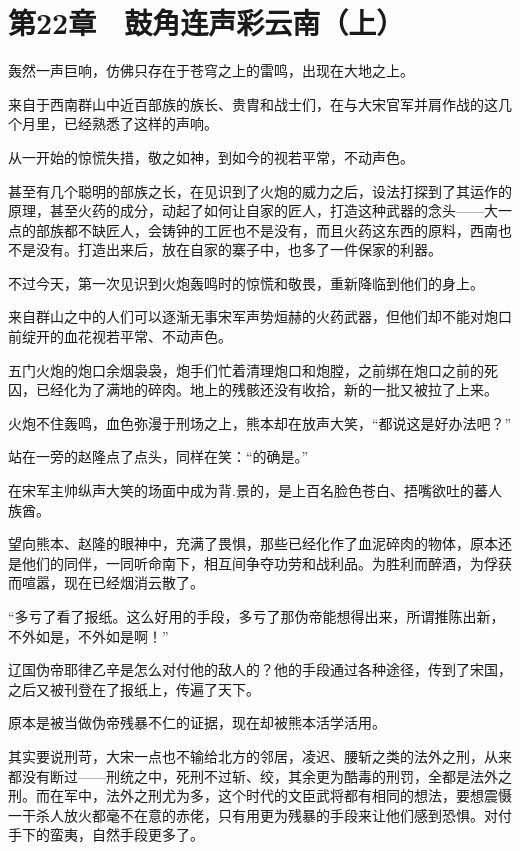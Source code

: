 \section{第22章　鼓角连声彩云南（上）}

轰然一声巨响，仿佛只存在于苍穹之上的雷鸣，出现在大地之上。

来自于西南群山中近百部族的族长、贵胄和战士们，在与大宋官军并肩作战的这几个月里，已经熟悉了这样的声响。

从一开始的惊慌失措，敬之如神，到如今的视若平常，不动声色。

甚至有几个聪明的部族之长，在见识到了火炮的威力之后，设法打探到了其运作的原理，甚至火药的成分，动起了如何让自家的匠人，打造这种武器的念头——大一点的部族都不缺匠人，会铸钟的工匠也不是没有，而且火药这东西的原料，西南也不是没有。打造出来后，放在自家的寨子中，也多了一件保家的利器。

不过今天，第一次见识到火炮轰鸣时的惊慌和敬畏，重新降临到他们的身上。

来自群山之中的人们可以逐渐无事宋军声势烜赫的火药武器，但他们却不能对炮口前绽开的血花视若平常、不动声色。

五门火炮的炮口余烟袅袅，炮手们忙着清理炮口和炮膛，之前绑在炮口之前的死囚，已经化为了满地的碎肉。地上的残骸还没有收拾，新的一批又被拉了上来。

火炮不住轰鸣，血色弥漫于刑场之上，熊本却在放声大笑，“都说这是好办法吧？”

站在一旁的赵隆点了点头，同样在笑：“的确是。”

在宋军主帅纵声大笑的场面中成为背.景的，是上百名脸色苍白、捂嘴欲吐的蕃人族酋。

望向熊本、赵隆的眼神中，充满了畏惧，那些已经化作了血泥碎肉的物体，原本还是他们的同伴，一同听命南下，相互间争夺功劳和战利品。为胜利而醉酒，为俘获而喧嚣，现在已经烟消云散了。

“多亏了看了报纸。这么好用的手段，多亏了那伪帝能想得出来，所谓推陈出新，不外如是，不外如是啊！”

辽国伪帝耶律乙辛是怎么对付他的敌人的？他的手段通过各种途径，传到了宋国，之后又被刊登在了报纸上，传遍了天下。

原本是被当做伪帝残暴不仁的证据，现在却被熊本活学活用。

其实要说刑苛，大宋一点也不输给北方的邻居，凌迟、腰斩之类的法外之刑，从来都没有断过——刑统之中，死刑不过斩、绞，其余更为酷毒的刑罚，全都是法外之刑。而在军中，法外之刑尤为多，这个时代的文臣武将都有相同的想法，要想震慑一干杀人放火都毫不在意的赤佬，只有用更为残暴的手段来让他们感到恐惧。对付手下的蛮夷，自然手段更多了。

